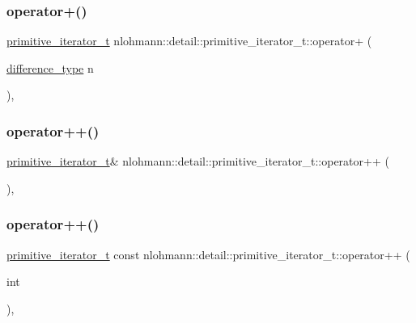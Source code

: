 \subsubsection{\texorpdfstring{operator+()}{operator+()}}
{\footnotesize\ttfamily \hyperlink{classnlohmann_1_1detail_1_1primitive__iterator__t}{primitive\+\_\+iterator\+\_\+t} nlohmann\+::detail\+::primitive\+\_\+iterator\+\_\+t\+::operator+ (\begin{DoxyParamCaption}\item[{\hyperlink{classnlohmann_1_1detail_1_1primitive__iterator__t_af3db0d5c90de427d51645fe73a015553}{difference\+\_\+type}}]{n }\end{DoxyParamCaption})\hspace{0.3cm}{\ttfamily [inline]}, {\ttfamily [noexcept]}}

\mbox{\label{classnlohmann_1_1detail_1_1primitive__iterator__t_ad26511012fc88f3ec5d9e1cb708732fd}} 
\subsubsection{\texorpdfstring{operator++()}{operator++()}\hspace{0.1cm}{\footnotesize\ttfamily [1/2]}}
{\footnotesize\ttfamily \hyperlink{classnlohmann_1_1detail_1_1primitive__iterator__t}{primitive\+\_\+iterator\+\_\+t}\& nlohmann\+::detail\+::primitive\+\_\+iterator\+\_\+t\+::operator++ (\begin{DoxyParamCaption}{ }\end{DoxyParamCaption})\hspace{0.3cm}{\ttfamily [inline]}, {\ttfamily [noexcept]}}

\mbox{\label{classnlohmann_1_1detail_1_1primitive__iterator__t_aa011863621357b3cf891670bf63a48b1}} 
\subsubsection{\texorpdfstring{operator++()}{operator++()}\hspace{0.1cm}{\footnotesize\ttfamily [2/2]}}
{\footnotesize\ttfamily \hyperlink{classnlohmann_1_1detail_1_1primitive__iterator__t}{primitive\+\_\+iterator\+\_\+t} const nlohmann\+::detail\+::primitive\+\_\+iterator\+\_\+t\+::operator++ (\begin{DoxyParamCaption}\item[{int}]{ }\end{DoxyParamCaption})\hspace{0.3cm}{\ttfamily [inline]}, {\ttfamily [noexcept]}}

